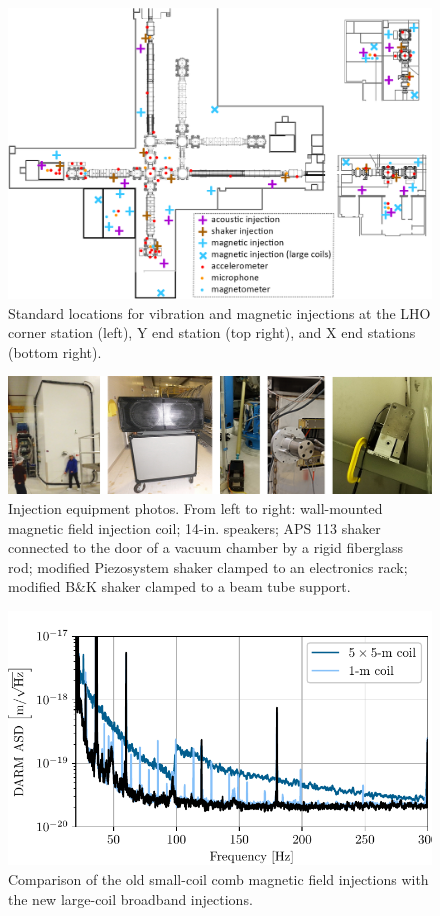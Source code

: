 \documentclass[11pt]{article}
\begin{document}
\begin{figure}[h!]
	\centering
	\includegraphics[width=\textwidth]{figures/injection-map.png}
	\caption{
		Standard locations for vibration and magnetic injections at the LHO corner station (left), Y end station (top right), and X end stations (bottom right).}
	\label{fig:injection_map}
\end{figure}

\begin{figure}[h!]
	\centering
	\includegraphics[width=\textwidth]{figures/injection-equipment.png}
	\caption{Injection equipment photos. From left to right: wall-mounted magnetic field injection coil; 14-in. speakers; APS 113 shaker connected to the door of a vacuum chamber by a rigid fiberglass rod; modified Piezosystem shaker clamped to an electronics rack; modified B\&K shaker clamped to a beam tube support.}
	\label{fig:injection_equipment}
\end{figure}


\begin{figure}[h!]
	\centering
	\includegraphics{figures/injection-wallcoil.pdf}
	\caption{
		Comparison of the old small-coil comb magnetic field injections with the new large-coil broadband injections.}
	\label{fig:injection_wallcoil}
\end{figure}
\end{document}
